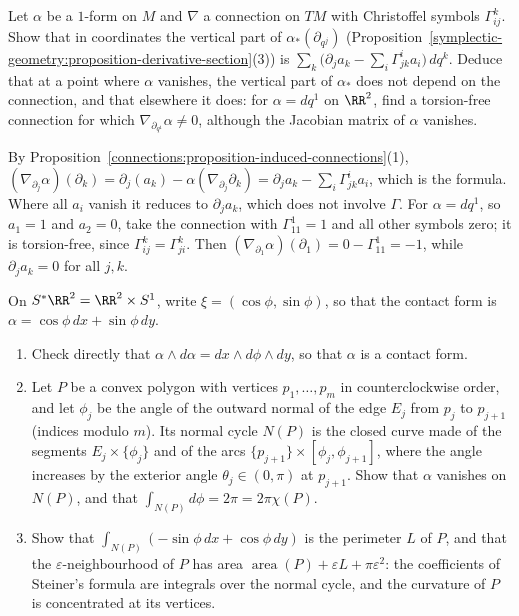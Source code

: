 \begin{exercise}\label{symplectic-geometry:exercise-derivative-section-connection}
Let $\alpha$ be a $1$-form on $M$ and $\nabla$ a connection on $TM$ with Christoffel symbols $\Gamma^k_{ij}$. Show that in coordinates the vertical part of $\alpha_*(\partial_{q^j})$
(Proposition~\ref{symplectic-geometry:proposition-derivative-section}(3)) is $\sum_k\bigl(\partial_ja_k - \sum_i\Gamma^i_{jk}a_i\bigr)\,dq^k$. Deduce that at a point where $\alpha$ vanishes, the vertical part
of $\alpha_*$ does not depend on the connection, and that elsewhere it does: for $\alpha = dq^1$ on $\RR^2$, find a torsion-free connection for which $\nabla_{\partial_{q^1}}\alpha \neq 0$, although the
Jacobian matrix of $\alpha$ vanishes.
\end{exercise}

\begin{solution}
By Proposition~\ref{connections:proposition-induced-connections}(1), $(\nabla_{\partial_j}\alpha)(\partial_k) = \partial_j(a_k) - \alpha(\nabla_{\partial_j}\partial_k) = \partial_ja_k - \sum_i\Gamma^i_{jk}a_i$, which is the
formula. Where all $a_i$ vanish it reduces to $\partial_ja_k$, which does not involve $\Gamma$. For $\alpha = dq^1$, so $a_1 = 1$ and $a_2 = 0$, take the connection with $\Gamma^1_{11} = 1$ and all other
symbols zero; it is torsion-free, since $\Gamma^k_{ij} = \Gamma^k_{ji}$. Then $(\nabla_{\partial_1}\alpha)(\partial_1) = 0 - \Gamma^1_{11} = -1$, while $\partial_ja_k = 0$ for all $j, k$.
\end{solution}

\begin{exercise}\label{symplectic-geometry:exercise-normal-cycle-polygon}
On $S^*\RR^2 = \RR^2 \times S^1$, write $\xi = (\cos\phi, \sin\phi)$, so that the contact form is $\alpha = \cos\phi\,dx + \sin\phi\,dy$.
\begin{enumerate}
\item Check directly that $\alpha \wedge d\alpha = dx \wedge d\phi \wedge dy$, so that $\alpha$ is a contact form.
\item Let $P$ be a convex polygon with vertices $p_1, \ldots, p_m$ in counterclockwise order, and let $\phi_j$ be the angle of the outward normal of the edge $E_j$ from $p_j$ to $p_{j+1}$ (indices modulo $m$). Its
normal cycle $N(P)$ is the closed curve made of the segments $E_j \times \{\phi_j\}$ and of the arcs $\{p_{j+1}\} \times [\phi_j, \phi_{j+1}]$, where the angle increases by the exterior angle
$\theta_j \in (0, \pi)$ at $p_{j+1}$. Show that $\alpha$ vanishes on $N(P)$, and that $\int_{N(P)}d\phi = 2\pi = 2\pi\chi(P)$.
\item Show that $\int_{N(P)}(-\sin\phi\,dx + \cos\phi\,dy)$ is the perimeter $L$ of $P$, and that the $\varepsilon$-neighbourhood of $P$ has area $\operatorname{area}(P) + \varepsilon L + \pi\varepsilon^2$: the coefficients of
Steiner's formula are integrals over the normal cycle, and the curvature of $P$ is concentrated at its vertices.
\end{enumerate}
\end{exercise}

